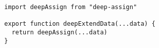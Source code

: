 \begin{verbatim}
  import deepAssign from "deep-assign"

  export function deepExtendData(...data) {
    return deepAssign(...data)
  }
\end{verbatim}
